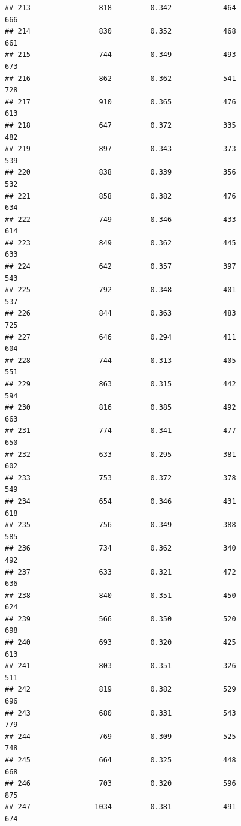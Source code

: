 \documentclass[]{book}
\begin{document}
\begin{verbatim}
## 213                818         0.342            464                 666
## 214                830         0.352            468                 661
## 215                744         0.349            493                 673
## 216                862         0.362            541                 728
## 217                910         0.365            476                 613
## 218                647         0.372            335                 482
## 219                897         0.343            373                 539
## 220                838         0.339            356                 532
## 221                858         0.382            476                 634
## 222                749         0.346            433                 614
## 223                849         0.362            445                 633
## 224                642         0.357            397                 543
## 225                792         0.348            401                 537
## 226                844         0.363            483                 725
## 227                646         0.294            411                 604
## 228                744         0.313            405                 551
## 229                863         0.315            442                 594
## 230                816         0.385            492                 663
## 231                774         0.341            477                 650
## 232                633         0.295            381                 602
## 233                753         0.372            378                 549
## 234                654         0.346            431                 618
## 235                756         0.349            388                 585
## 236                734         0.362            340                 492
## 237                633         0.321            472                 636
## 238                840         0.351            450                 624
## 239                566         0.350            520                 698
## 240                693         0.320            425                 613
## 241                803         0.351            326                 511
## 242                819         0.382            529                 696
## 243                680         0.331            543                 779
## 244                769         0.309            525                 748
## 245                664         0.325            448                 668
## 246                703         0.320            596                 875
## 247               1034         0.381            491                 674

\end{verbatim}
\end{document}
